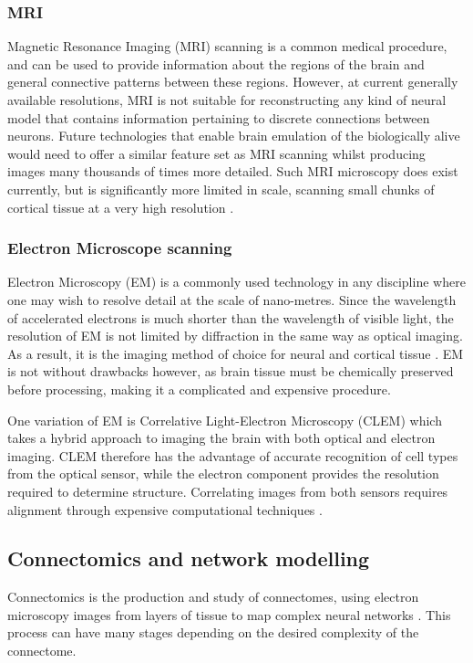 \subsubsection*{MRI}

Magnetic Resonance Imaging (MRI) scanning is a common medical procedure, and can
be used to provide information about the regions of the brain and general
connective patterns between these regions. However, at current generally
available resolutions, MRI is not suitable for reconstructing any kind of neural
model that contains information pertaining to discrete connections between
neurons. Future technologies that enable brain emulation of the
biologically alive would need to offer a similar feature set as MRI scanning
whilst producing images many thousands of times more detailed. Such MRI
microscopy does exist currently, but is significantly more limited in scale,
scanning small chunks of cortical tissue at a very high resolution
\autocite{johnson_three-dimensional_1987,bostrom_whole_2008}.

\subsubsection*{Electron Microscope scanning}

Electron Microscopy (EM) is a commonly used technology in any discipline where
one may wish to resolve detail at the scale of nano-metres. Since the wavelength
of accelerated electrons is much shorter than the wavelength of visible light,
the resolution of EM is not limited by diffraction in the same way as optical
imaging. As a result, it is the imaging method of choice for neural and cortical
tissue \autocite{marc_retinal_2013, kaynig_large-scale_2015}. EM is not without
drawbacks however, as brain tissue must be chemically preserved before
processing, making it a complicated and expensive procedure. 

One variation of EM is Correlative Light-Electron Microscopy (CLEM) which takes
a hybrid approach to imaging the brain with both optical and electron imaging.
CLEM therefore has the advantage of accurate recognition of cell types from the
optical sensor, while the electron component provides the resolution required to
determine structure. Correlating images from both sensors requires alignment
through expensive computational techniques \autocite{voortman_integration_2014}.


\subsection{Connectomics and network modelling}
Connectomics is the production and study of connectomes, using electron
microscopy images from layers of tissue to map complex neural networks
\autocite{marc_retinal_2013}. This process can have many stages depending on the
desired complexity of the connectome. 

